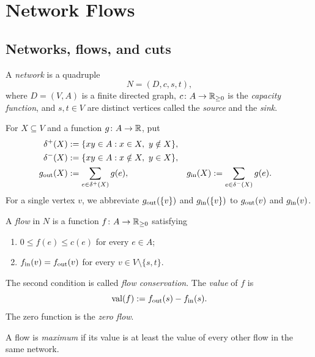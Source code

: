 \chapter{Network Flows}

\section{Networks, flows, and cuts}

\begin{notedefinition}
A \emph{network} is a quadruple
\[
  N=(D,c,s,t),
\]
where $D=(V,A)$ is a finite directed graph, $c\colon A\to\mathbb{R}_{\ge0}$ is the
\emph{capacity function}, and $s,t\in V$ are distinct vertices called the
\emph{source} and the \emph{sink}.

For $X\subseteq V$ and a function $g\colon A\to\mathbb{R}$, put
\[
\begin{aligned}
  \delta^+(X)&:=\{xy\in A:x\in X,\ y\notin X\},\\
  \delta^-(X)&:=\{xy\in A:x\notin X,\ y\in X\},\\
  g_{\operatorname{out}}(X)&:=\sum_{e\in\delta^+(X)}g(e),
  &g_{\operatorname{in}}(X)&:=\sum_{e\in\delta^-(X)}g(e).
\end{aligned}
\]
For a single vertex $v$, we abbreviate $g_{\operatorname{out}}(\{v\})$ and
$g_{\operatorname{in}}(\{v\})$ to $g_{\operatorname{out}}(v)$ and $g_{\operatorname{in}}(v)$.
\end{notedefinition}

\begin{notedefinition}
A \emph{flow} in $N$ is a function $f\colon A\to\mathbb{R}_{\ge0}$ satisfying
\begin{enumerate}
  \item $0\le f(e)\le c(e)$ for every $e\in A$;
  \item $f_{\operatorname{in}}(v)=f_{\operatorname{out}}(v)$ for every $v\in V\setminus\{s,t\}$.
\end{enumerate}
The second condition is called \emph{flow conservation}.  The \emph{value} of
$f$ is
\[
  \operatorname{val}(f):=f_{\operatorname{out}}(s)-f_{\operatorname{in}}(s).
\]
The zero function is the \emph{zero flow}.
\end{notedefinition}

\begin{notedefinition}
A flow is \emph{maximum} if its value is at least the value of every other
flow in the same network.
\end{notedefinition}

